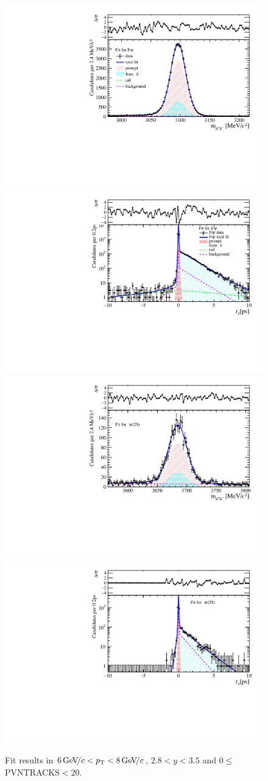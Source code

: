 \begin{figure}[H]
\begin{center}
\includegraphics[width=0.47\linewidth]{pdf/Jpsi/drawmass/n1y2pt4.pdf}
\includegraphics[width=0.47\linewidth]{pdf/Jpsi/2DFit/n1y2pt4.pdf}
\vspace*{-0.5cm}
\includegraphics[width=0.47\linewidth]{pdf/Psi2S/drawmass/n1y2pt4.pdf}
\includegraphics[width=0.47\linewidth]{pdf/Psi2S/2DFit/n1y2pt4.pdf}
\vspace*{-0.5cm}
\end{center}
\caption{Fit results in $6\text{\,Ge\kern -0.1em V\!/}c<p_{\mathrm{T}}<8\text{\,Ge\kern -0.1em V\!/}c$, $2.8<y<3.5$ and 0$\leq$PVNTRACKS$<$20.}
\label{Fitn1y2pt4}
\end{figure}
